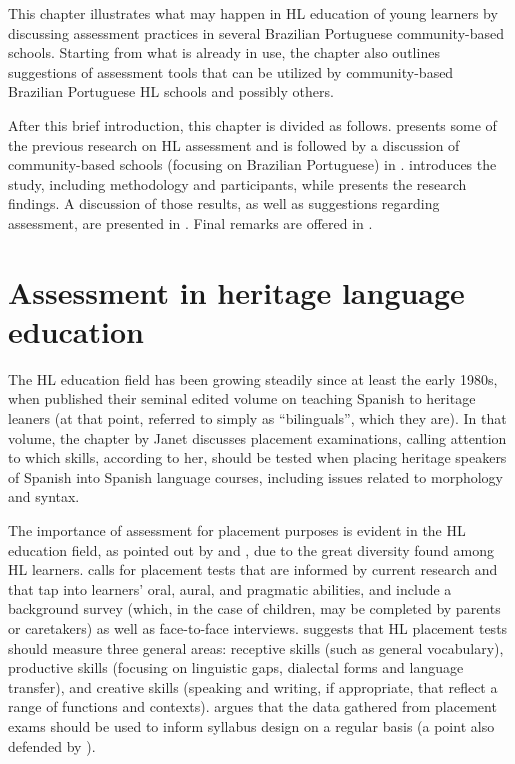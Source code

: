 \documentclass[output=paper]{langscibook}
\begin{document}
This chapter illustrates what may happen in HL education of young learners by discussing assessment practices in several Brazilian Portuguese community-based schools. Starting from what is already in use, the chapter also outlines suggestions of assessment tools that can be utilized by community-based Brazilian Portuguese HL schools and possibly others.

After this brief introduction, this chapter is divided as follows.  presents some of the previous research on HL assessment and is followed by a discussion of community-based schools (focusing on Brazilian Portuguese) in .  introduces the study, including methodology and participants, while  presents the research findings. A discussion of those results, as well as suggestions regarding assessment, are presented in . Final remarks are offered in .

\section{Assessment in heritage language education}\label{sec:6:2}

  The HL education field has been growing steadily since at least the early 1980s, when \citet{ValdésGarcía-Moya1981} published their seminal edited volume on teaching Spanish to heritage leaners (at that point, referred to simply as “bilinguals”, which they are). In that volume, the chapter by Janet \citet{Ziegler1981} discusses placement examinations, calling attention to which skills, according to her, should be tested when placing heritage speakers of Spanish into Spanish language courses, including issues related to morphology and syntax.

  The importance of assessment for placement purposes is evident in the HL education field, as pointed out by \citet{Fairclough2012b} and \citet{Carreira2012a}, due to the great diversity found among HL learners. \citet{MacGregor-Mendoza2012} calls for placement tests that are informed by current research and that tap into learners’ oral, aural, and pragmatic abilities, and include a background survey (which, in the case of children, may be completed by parents or caretakers) as well as face-to-face interviews. \citet[126]{Fairclough2012a} suggests that HL placement tests should measure three general areas: receptive skills (such as general vocabulary), productive skills (focusing on linguistic gaps, dialectal forms and language transfer), and creative skills (speaking and writing, if appropriate, that reflect a range of functions and contexts). \citet{Carreira2012b} argues that the data gathered from placement exams should be used to inform syllabus design on a regular basis (a point also defended by \citealt{IlievaClark-Gareca2016}).
\end{document}
